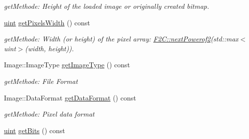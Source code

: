 \begin{DoxyCompactItemize}
\begin{DoxyCompactList}\small\item\em getMethode: Height of the loaded image or originally created bitmap. \item\end{DoxyCompactList}\item 
\hypertarget{class_f2_c_1_1_bitmap_ad51ff5cc348345114a1aa4ab5a368945}{
\hyperlink{namespace_f2_c_a58be2bac9eb3e3c99cb41b6008bf4fae}{uint} \hyperlink{class_f2_c_1_1_bitmap_ad51ff5cc348345114a1aa4ab5a368945}{getPixelsWidth} () const }
\label{class_f2_c_1_1_bitmap_ad51ff5cc348345114a1aa4ab5a368945}

\begin{DoxyCompactList}\small\item\em getMethode: Width (or height) of the pixel array: \hyperlink{namespace_f2_c_a60c6d5786600a7d7bfb8c4bfafa55419}{F2C::nextPowerof2}(std::max$<$uint$>$(width, height)). \item\end{DoxyCompactList}\item 
\hypertarget{class_f2_c_1_1_bitmap_a49e44e01102035e194c95becff0778f5}{
Image::ImageType \hyperlink{class_f2_c_1_1_bitmap_a49e44e01102035e194c95becff0778f5}{getImageType} () const }
\label{class_f2_c_1_1_bitmap_a49e44e01102035e194c95becff0778f5}

\begin{DoxyCompactList}\small\item\em getMethode: File Format \item\end{DoxyCompactList}\item 
\hypertarget{class_f2_c_1_1_bitmap_a7ab273e73d0b9563fb9d3ea358fdbf05}{
Image::DataFormat \hyperlink{class_f2_c_1_1_bitmap_a7ab273e73d0b9563fb9d3ea358fdbf05}{getDataFormat} () const }
\label{class_f2_c_1_1_bitmap_a7ab273e73d0b9563fb9d3ea358fdbf05}

\begin{DoxyCompactList}\small\item\em getMethode: Pixel data format \item\end{DoxyCompactList}\item 
\hypertarget{class_f2_c_1_1_bitmap_abb09e143c164a7e137d720c10ec66457}{
\hyperlink{namespace_f2_c_a58be2bac9eb3e3c99cb41b6008bf4fae}{uint} \hyperlink{class_f2_c_1_1_bitmap_abb09e143c164a7e137d720c10ec66457}{getBits} () const }
\label{class_f2_c_1_1_bitmap_abb09e143c164a7e137d720c10ec66457}


\end{DoxyCompactItemize}
